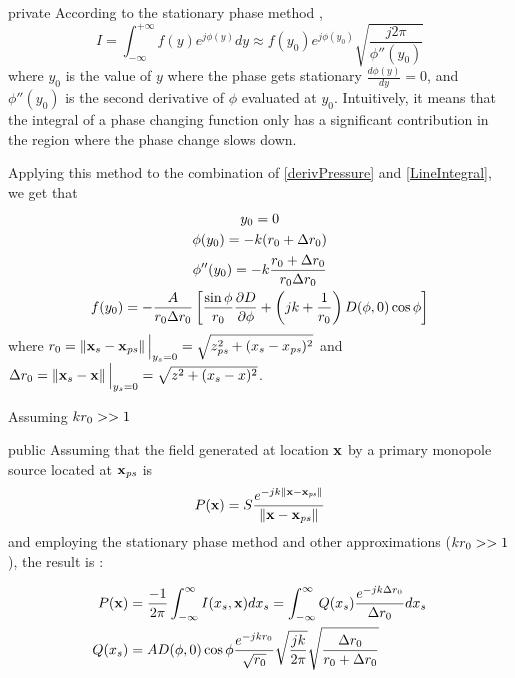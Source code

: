 \begin{shownto}{private}
According to the stationary phase method \cite{Verheijen},
\begin{equation}
I = \int_{-\infty}^{+\infty} f(y) e^{j\phi(y)} dy \approx f(y_0) e^{j\phi(y_0)} \sqrt{\frac{j 2\pi}{\phi''(y_0)}}
\end{equation}
where $y_0$ is the value of $y$ where the phase gets stationary $\frac{d\phi(y)}{dy} = 0$, and $\phi''(y_0)$ is the second derivative of $\phi$ evaluated at $y_0$. Intuitively, it means that the integral of a phase changing function only has a significant contribution in the region where the phase change slows down.

Applying this method to the combination of \autoref{derivPressure} and \autoref{LineIntegral}, we get that
\begin{gather}
	y_0 = 0 \\
	\phi(y_0) = -k(\distLinePrimSource + \distLinePoint) \\
	\phi''(y_0) = -k\frac{\distLinePrimSource + \distLinePoint}{\distLinePrimSource \distLinePoint} \\
	f(y_0) = -\frac{A}{\distLinePrimSource \distLinePoint}\left[ \frac{\sin\phi}{\distLinePrimSource} \frac{\partial\Diag}{\partial\phi} + \left(jk + \frac{1}{\distLinePrimSource}\right) \Diag(\phi, 0) \cos\phi \right]
\end{gather}
where $\distLinePrimSource = \norm{\PosTheo[surface] - \PosTheo[primarySource]}\Big\vert_{y_{\PosTheoSubInd[surface]} = 0} = \sqrt{z_{\PosTheoSubInd[primarySource]}^2 + (x_{\PosTheoSubInd[surface]} - x_{\PosTheoSubInd[primarySource]})^2}$ and $\distLinePoint = \norm{\PosTheo[surface] - \PosTheo}\Big\vert_{y_{\PosTheoSubInd[surface]} = 0} = \sqrt{z^2 + (x_{\PosTheoSubInd[surface]} - x)^2}$.

Assuming $kr_0 >> 1$
\end{shownto}
\begin{shownto}{public}
Assuming that the field generated at location $\PosTheo$ by a primary monopole source located at $\PosTheo[primarySource]$ is 
\begin{equation}
P(\PosTheo) = S \GreenFunc[{\PosTheo - \PosTheo[primarySource]}]
\end{equation}
and employing the stationary phase method and other approximations ($kr_0 >> 1$), the result is \cite{Start1997}:
\end{shownto}
\begin{equation}
\begin{aligned}
P(\PosTheo) &= \frac{-1}{2\pi} \int_{-\infty}^{\infty} I(x_{\PosTheoSubInd[surface]}, \PosTheo) dx_{\PosTheoSubInd[surface]} = \int_{-\infty}^{\infty} Q(x_{\PosTheoSubInd[surface]})
\frac{e^{-jk\distLinePoint}}{\distLinePoint} dx_{\PosTheoSubInd[surface]}\\ 
Q(x_{\PosTheoSubInd[surface]}) &= A \Diag(\phi, 0) \cos\phi \frac{e^{-jk \distLinePrimSource}}{\sqrt{\distLinePrimSource}} \sqrt{\frac{jk}{2\pi}} \sqrt{\frac{\distLinePoint}{\distLinePrimSource + \distLinePoint}}
\end{aligned}
\label{RayleighI2.5}
\end{equation}

